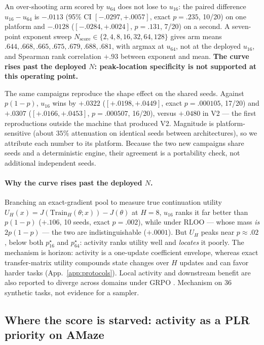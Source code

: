 An over-shooting arm scored by $u_{64}$ does not lose to $u_{16}$: the paired
difference $u_{16}-u_{64}$ is $-.0113$ (95\% CI $[-.0297,+.0057]$, exact
$p=.235$, 10/20) on one platform and $-.0128$ ($[-.0284,+.0024]$, $p=.131$,
7/20) on a second. A seven-point exponent sweep
$N_{\text{score}}\in\{2,4,8,16,32,64,128\}$ gives arm means
$.644,.668,.665,.675,.679,.688,.681$, with argmax at $u_{64}$, not at the
deployed $u_{16}$, and Spearman rank correlation $+.93$ between exponent and
mean. \textbf{The curve rises past the deployed $N$: peak-location specificity
is not supported at this operating point.}

The same campaigns reproduce the shape effect on the shared seeds. Against
$p(1-p)$, $u_{16}$ wins
by $+.0322$ ($[+.0198,+.0449]$, exact $p=.000105$, 17/20) and $+.0307$
($[+.0166,+.0453]$, $p=.000507$, 16/20), versus $+.0480$ in V2 --- the first
reproductions outside the machine that produced V2. Magnitude is
platform-sensitive (about $35\%$
attenuation on identical seeds between architectures), so we attribute
each number to its platform. Because the two new campaigns share seeds and a
deterministic engine, their agreement is a portability check, not additional
independent seeds.

\paragraph{Why the curve rises past the deployed $N$.}
Branching an exact-gradient pool to measure true continuation utility
$U_H(x)=J(\mathrm{Train}_H(\theta;x))-J(\theta)$ at $H=8$, $u_{16}$ ranks it
far better than $p(1-p)$ ($+.106$, 10 seeds, exact $p=.002$), while under RLOO
--- whose mass \emph{is} $2p(1-p)$ --- the two are indistinguishable
($+.0001$). But $U_H$ peaks near $p\approx.02$, below both $p^\star_{16}$ and
$p^\star_{64}$: activity ranks utility well and \emph{locates} it poorly.
The mechanism is horizon: activity is a one-update coefficient envelope,
whereas exact transfer-matrix utility compounds state changes over $H$ updates
and can favor harder tasks (App.~\ref{app:protocols}).
Local activity and downstream benefit are also reported to diverge across
domains under GRPO \citep{tac}. Mechanism on 36 synthetic tasks, not evidence
for a sampler.

\subsection{Where the score is starved: activity as a PLR priority on AMaze}
\label{sec:amaze}

